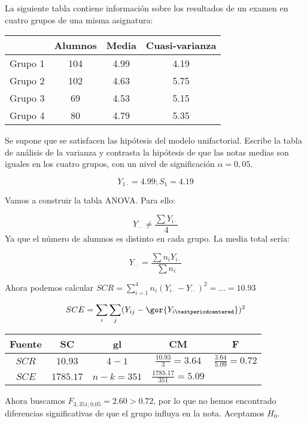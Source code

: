 \begin{problem}[16]

La siguiente tabla contiene información sobre los resultados de un examen en cuatro grupos de una misma asignatura:


\begin{center}
  \begin{tabular}{| c | c | c | c |}
    \hline
    	& Alumnos & Media & Cuasi-varianza \\ \hline
		Grupo 1 & 104 & 4.99 & 4.19 \\ \hline
		Grupo 2 & 102 & 4.63 & 5.75 \\ \hline
		Grupo 3 & 69 & 4.53 & 5.15 \\ \hline
		Grupo 4 & 80 & 4.79 & 5.35 \\
    \hline
  \end{tabular}
\end{center}

Se supone que se satisfacen las hipótesis del modelo unifactorial. Escribe la tabla de análisis de la varianza y contrasta la hipótesis de que las notas medias son iguales en los cuatro grupos, con un nivel de significación $α = 0,05$.

\solution

\[Y_{1·} = 4.99; S_1 = 4.19\]

Vamos a construir la tabla ANOVA. Para ello:

\[Y_{··} ≠ \frac{\sum Y_{i·}}{4}\]
Ya que el número de alumnos es distinto en cada grupo. La media total sería:

\[Y_{··} = \frac{\sum n_i Y_{i·}}{\sum n_i}\]

Ahora podemos calcular $SCR = \sum_{i=1}^4 n_i (Y_{i·} - Y_{··})^2 = ... = 10.93$

\[SCE = \sum_i \sum_j(Y_{ij}-\gor{Y_{i·}})^2\]
\begin{center}
\begin{tabular}{ccccc}
Fuente & SC & gl & CM&F\\\hline
$SCR$ & $10.93$ & $4-1$ & $\frac{10.93}{3} = 3.64$&$\frac{3.64}{5.09} = 0.72$\\
$SCE$ & $1785.17$ & $n-k = 351$ & $\frac{1785.17}{351} = 5.09$ & 
\end{tabular}
\end{center}

Ahora buscamos $F_{3,351;0.05} = 2.60 > 0.72$, por lo que no hemos encontrado diferencias significativas de que el grupo influya en la nota. Aceptamos $H_0$.

\end{problem}


